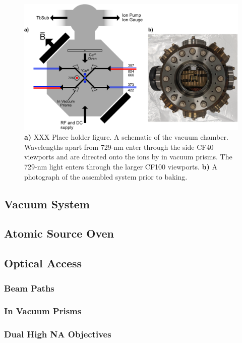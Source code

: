 \documentclass[12pt]{report}
\begin{document}
\begin{figure}
  \begin{center}
   \noindent\includegraphics[width=0.9\linewidth]{figures/pdf_figure/vacuum_can-crop.pdf}
  \end{center}
  \caption{
    \textbf{a)} XXX Place holder figure. A schematic of the vacuum chamber.
    Wavelengths apart from 729-nm enter through the side CF40 viewports and are
    directed onto the ions by in vacuum prisms. The 729-nm light enters through
    the larger CF100 viewports.  \textbf{b)} A photograph of the assembled
    system prior to baking.
  }
  \label{fig:can}
\end{figure}

\subsection{Vacuum System}
\subsection{Atomic Source Oven}
\subsection{Optical Access}
\subsubsection{Beam Paths}
\subsubsection{In Vacuum Prisms}
\subsubsection{Dual High NA Objectives}
\end{document}
